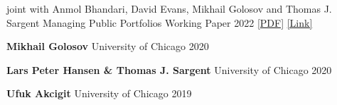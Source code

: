 


\begin{cventries}

  \cventry
  {joint with Anmol Bhandari, David Evans, Mikhail Golosov and Thomas J. Sargent} %
  {Managing Public Portfolios}  %
  {Working Paper} %
  {2022} %
  {\href{https://static1.squarespace.com/static/54c19f18e4b0ef5f4b9f8dae/t/6328ee5213a65c43a48423f8/1663626851912/abegs4draft.pdf}{[PDF]} \href{https://www.nber.org/papers/w30501}{[Link]}}

\end{cventries}


\begin{cvhonors}
  \cvhonor
  {\textbf{Mikhail Golosov}} %
  {University of Chicago} %
  {} %
  {2020} %

  \cvhonor
  {\textbf{Lars Peter Hansen \& Thomas J. Sargent}} %
  {University of Chicago} %
  {} %
  {2020} %

  \cvhonor
  {\textbf{Ufuk Akcigit}} %
  {University of Chicago} %
  {} %
  {2019} %

\end{cvhonors}

